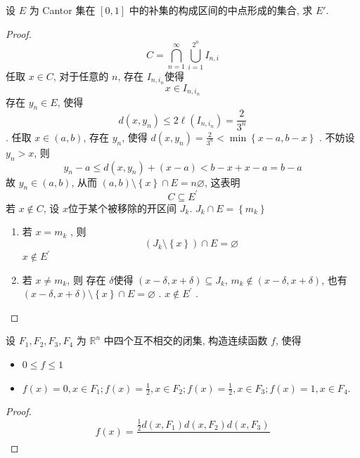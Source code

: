 \documentclass[../main.tex]{subfiles}
\begin{document}
\begin{exercise}{}{}
设 $E$ 为 Cantor 集在 $[0, 1]$ 中的补集的构成区间的中点形成的集合, 求 $E'$.
\end{exercise}
\begin{proof}
    \[
    C= \bigcap _{n = 1}^{\infty}\bigcup _{i= 1}^{2^{n}}I_{n, i}
    \]任取 \(  x \in C  \), 对于任意的 \(  n  \), 存在 \(  I_{n, i_{n}}  \)使得 \[
    x \in I_{n,i_{n}}
    \]存在 \(  y_{n}\in E  \), 使得 \[
    d\left( x,y_{n} \right)\le 2  \ell\left( I_{n, i_{n}} \right)= \frac{2 }{3^{n} }   
    \] . 任取 \(  x\in \left( a,b \right)   \),     存在 \(  y_{n}  \), 使得 \(  d\left( x,y_{n} \right)= \frac{2 }{3^{n} }< \min \left\{ x-a, b-x \right\}    \) . 不妨设 \(  y_{n}> x  \), 则 \[
    y_{n}-a\le d\left( x,y_{n} \right)+ \left( x-a \right)< b-x+ x-a= b-a  
    \]故 \(  y_{n}\in \left( a,b \right)   \), 从而 \( \left( a,b \right)\setminus \left\{ x \right\}\cap E= n\varnothing   \), 这表明 \[
    C\subseteq E^{\prime} 
    \]   若 \(  x\not \in C  \), 设 \(  x  \)位于某个被移除的开区间 \(  J_{k}  \). \(  J_{k}\cap E= \left\{ m_{k} \right\}  \) 
    \begin{enumerate}
        \item 若 \(  x= m_{k}  \) , 则 \[
        \left( J_{k}\setminus \left\{ x \right\} \right)\cap E= \varnothing 
        \]\(  x  \not \in E^{\prime} \)
        \item 若 \(  x\neq m_{k}  \), 则 存在 \(   \delta   \)使得 \(  \left( x- \delta ,x+  \delta  \right)\subseteq J_{k}   \), \(  m_{k}\not \in \left( x- \delta ,x+  \delta  \right)   \),     也有 \(  \left( x- \delta ,x+  \delta  \right)\setminus \left\{ x \right\} \cap E= \varnothing   \) . \(  x\not \in E^{\prime}   \) .
    \end{enumerate}
      
\end{proof}
\begin{exercise}{}{}
设 $F_1, F_2, F_3, F_4$ 为 $\mathbb{R}^n$ 中四个互不相交的闭集, 构造连续函数 $f$, 使得
\begin{itemize}
    \item $0 \le f \le 1$
    \item $f(x) = 0, x \in F_1; f(x) = \frac{1}{2}, x \in F_2; f(x) = \frac{1}{2}, x \in F_3; f(x) = 1, x \in F_4$.
\end{itemize}
\end{exercise}
\begin{proof}
  \[
  f\left( x \right)= \frac{\frac{1}{2}d\left( x,F_1 \right)d\left( x,F_2 \right)d\left( x,F_3 \right)    }{ }  
  \]
\end{proof}
\end{document}
